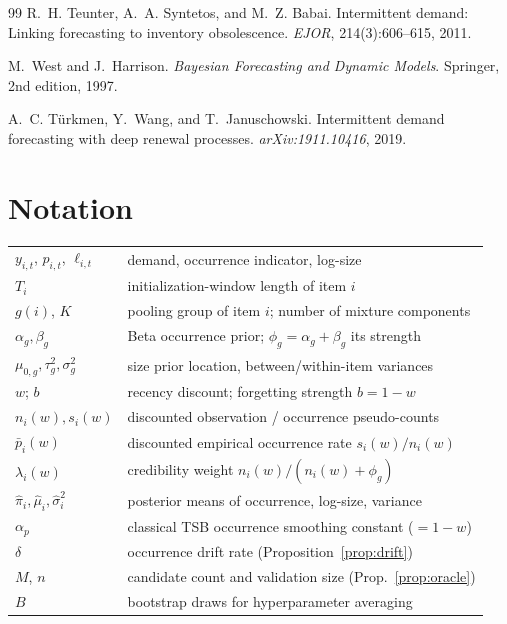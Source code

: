 \documentclass[twocolumn,10pt]{article}
\begin{document}
\begin{thebibliography}{99}
R.~H. Teunter, A.~A. Syntetos, and M.~Z. Babai.
\newblock Intermittent demand: Linking forecasting to inventory
  obsolescence.
\newblock \emph{EJOR}, 214(3):606--615, 2011.

M.~West and J.~Harrison.
\newblock \emph{Bayesian Forecasting and Dynamic Models}.
\newblock Springer, 2nd edition, 1997.

A.~C. T\"urkmen, Y.~Wang, and T.~Januschowski.
\newblock Intermittent demand forecasting with deep renewal processes.
\newblock \emph{arXiv:1911.10416}, 2019.

\end{thebibliography}

\appendix
\onecolumn

\section{Notation}\label{app:notation}

\begin{table}[h]
\centering
\small
\begin{tabular}{ll}
\toprule
$y_{i,t}$, $p_{i,t}$, $\ell_{i,t}$ & demand, occurrence indicator, log-size\\
$T_i$ & initialization-window length of item $i$\\
$g(i)$, $K$ & pooling group of item $i$; number of mixture components\\
$\alpha_g,\beta_g$ & Beta occurrence prior; $\phi_g=\alpha_g+\beta_g$ its strength\\
$\mu_{0,g},\tau^2_g,\sigma^2_g$ & size prior location, between/within-item variances\\
$w$; $b$ & recency discount; forgetting strength $b=1-w$\\
$n_i(w), s_i(w)$ & discounted observation / occurrence pseudo-counts\\
$\bar p_i(w)$ & discounted empirical occurrence rate $s_i(w)/n_i(w)$\\
$\lambda_i(w)$ & credibility weight $n_i(w)/(n_i(w)+\phi_g)$\\
$\hat\pi_i,\hat\mu_i,\hat\sigma^2_i$ & posterior means of occurrence, log-size, variance\\
$\alpha_p$ & classical TSB occurrence smoothing constant ($=1-w$)\\
$\delta$ & occurrence drift rate (Proposition~\ref{prop:drift})\\
$M$, $n$ & candidate count and validation size (Prop.~\ref{prop:oracle})\\
$B$ & bootstrap draws for hyperparameter averaging\\
\bottomrule
\end{tabular}
\end{table}
\end{document}
